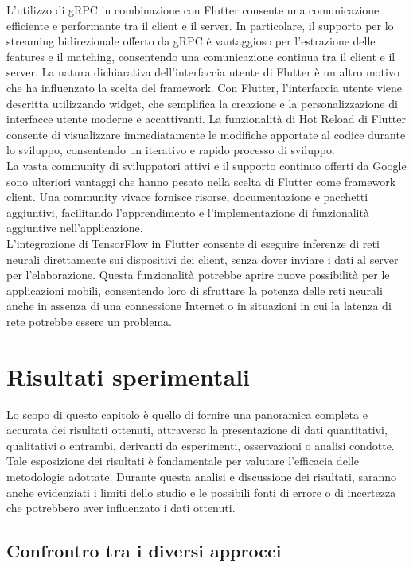 \documentclass[a4paper,12pt]{report}
\begin{document}
    L'utilizzo di gRPC in combinazione con Flutter consente una comunicazione efficiente e performante tra il client e il server. In particolare, il supporto per lo streaming bidirezionale offerto da gRPC è vantaggioso per l'estrazione delle features e il matching, consentendo una comunicazione continua tra il client e il server.
    La natura dichiarativa dell'interfaccia utente di Flutter è un altro motivo che ha influenzato la scelta del framework. Con Flutter, l'interfaccia utente viene descritta utilizzando widget, che semplifica la creazione e la personalizzazione di interfacce utente moderne e accattivanti. La funzionalità di Hot Reload di Flutter consente 
     di visualizzare immediatamente le modifiche apportate al codice durante lo sviluppo, consentendo un iterativo e rapido processo di sviluppo.
    \\
    La vasta community di sviluppatori attivi e il supporto continuo offerti da Google sono ulteriori vantaggi che hanno pesato nella scelta di Flutter come framework client. Una community vivace fornisce risorse, documentazione e pacchetti aggiuntivi, facilitando l'apprendimento e l'implementazione di funzionalità aggiuntive nell'applicazione.
    \\
    L'integrazione di TensorFlow in Flutter consente di eseguire inferenze di reti neurali direttamente sui dispositivi dei client, senza dover inviare i dati al server per l'elaborazione. Questa funzionalità potrebbe aprire nuove possibilità per le applicazioni mobili, consentendo loro di sfruttare la potenza delle reti neurali anche in assenza di una connessione Internet o in situazioni in cui la latenza di rete potrebbe essere un problema.
\chapter{Risultati sperimentali}
Lo scopo di questo capitolo è quello di fornire una panoramica completa e accurata dei risultati ottenuti, attraverso la presentazione di dati quantitativi, qualitativi o entrambi, derivanti da esperimenti, osservazioni o analisi condotte. Tale esposizione dei risultati è fondamentale per valutare l'efficacia delle metodologie adottate.
Durante questa analisi e discussione dei risultati, saranno anche evidenziati i limiti dello studio e le possibili fonti di errore o di incertezza che potrebbero aver influenzato i dati ottenuti.
  \section{Confrontro tra i diversi approcci}
\end{document}
